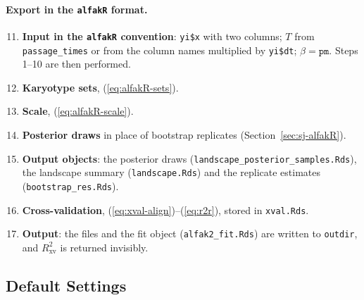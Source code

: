\documentclass[11pt]{article}
\begin{document}
\paragraph{Export in the \texttt{alfakR} format.}
\begin{enumerate}
\setcounter{enumi}{10}
\item \textbf{Input in the \texttt{alfakR} convention}: \texttt{yi\$x} with
two columns; $T$ from \texttt{passage\_times} or from the column names
multiplied by \texttt{yi\$dt}; $\beta=\texttt{pm}$. Steps 1--10 are then
performed.
\item \textbf{Karyotype sets}, (\ref{eq:alfakR-sets}).
\item \textbf{Scale}, (\ref{eq:alfakR-scale}).
\item \textbf{Posterior draws} in place of bootstrap replicates
(Section~\ref{sec:sj-alfakR}).
\item \textbf{Output objects}: the posterior draws
(\texttt{landscape\_posterior\_samples.Rds}), the landscape summary
(\texttt{landscape.Rds}) and the replicate estimates
(\texttt{bootstrap\_res.Rds}).
\item \textbf{Cross-validation}, (\ref{eq:xval-align})--(\ref{eq:r2r}),
stored in \texttt{xval.Rds}.
\item \textbf{Output}: the files and the fit object (\texttt{alfak2\_fit.Rds})
are written to \texttt{outdir}, and $R^2_{\mathrm{xv}}$ is returned
invisibly.
\end{enumerate}

\subsection{Default Settings}
\end{document}

